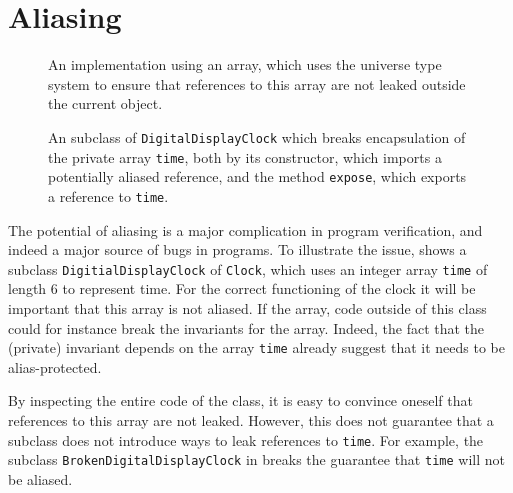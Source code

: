 \documentclass{llncs}
\begin{document}
\section{Aliasing}
\label{Sec:ownership}

\begin{figure}[tbp] \label{Example:alias}
%
%
\vspace*{-3ex} %
\caption{An implementation using an array, which uses the universe type 
system \cite{Mueller-Poetzsch-Heffter-Leavens03} to ensure that references
to this array are not leaked outside the current object.}
\end{figure}

\begin{figure}[tbp] \label{Example:brokenalias}
%
%
\vspace*{-2ex} %
\caption{An subclass of \texttt{DigitalDisplayClock} which breaks encapsulation
of the private array \texttt{time}, both by its constructor, which imports
a potentially aliased reference, and the method \texttt{expose}, which exports
a reference to \texttt{time}.}
\end{figure}

The potential of aliasing is a major complication in program verification,
and indeed a major source of bugs in programs. 
To illustrate the issue,  shows a subclass 
\texttt{DigitialDisplayClock} 
of \texttt{Clock}, which uses an integer array \texttt{time} of length 6 
to represent time.  For the correct functioning of the clock it will be 
important that this array is not aliased. If the array, code outside of
this class could for instance break the invariants for the array.
Indeed, the fact that the (private) invariant depends on the array \texttt{time}
already suggest that it needs to be alias-protected.

By inspecting the entire code of the class, it is easy to convince
oneself that references to this array are not leaked.
However, this does not guarantee that a subclass does not introduce
ways to leak references to \texttt{time}.
For example, the subclass \texttt{BrokenDigitalDisplayClock} in 
 breaks the guarantee that \texttt{time}
will not be aliased.
\end{document}
